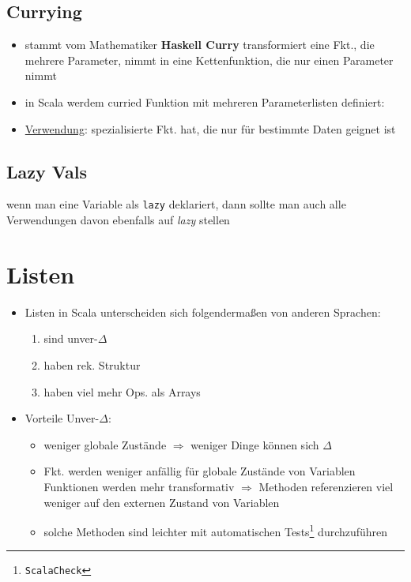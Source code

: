 \subsection{Currying}
\begin{itemize}
  \item stammt vom Mathematiker \textbf{Haskell Curry} \und transformiert
  eine Fkt., die mehrere Parameter, nimmt in eine Kettenfunktion, die 
  nur einen Parameter nimmt
  \item in Scala werdem curried Funktion mit mehreren Parameterlisten
  definiert:
  
  
  
  \item \uline{Verwendung}: spezialisierte Fkt. hat, die nur für 
  bestimmte Daten geignet ist
\end{itemize}


\subsection{Lazy Vals}
wenn man eine Variable als \texttt{lazy} deklariert, dann sollte
man auch alle Verwendungen davon ebenfalls auf \textit{lazy} stellen 

 
\pagebreak


\section{Listen}
\begin{itemize}
  \item Listen in Scala unterscheiden sich folgendermaßen von
  anderen Sprachen: \begin{enumerate}
    \item sind unver-$\Delta$
    \item haben rek. Struktur
    \item haben viel mehr Ops. als Arrays
  \end{enumerate}
  
  
  
  \item Vorteile Unver-$\Delta$:
  \begin{itemize}
    \item weniger globale Zustände $\Rightarrow$ weniger Dinge können 
    sich $\Delta$
    \item Fkt. werden weniger anfällig für globale Zustände von Variablen 
    \und Funktionen werden mehr transformativ $\Rightarrow$ Methoden
    referenzieren viel weniger auf den externen Zustand von Variablen
    \item solche Methoden sind leichter mit automatischen 
    Tests\footnote{\texttt{ScalaCheck}} durchzuführen
  \end{itemize}
\end{itemize}


